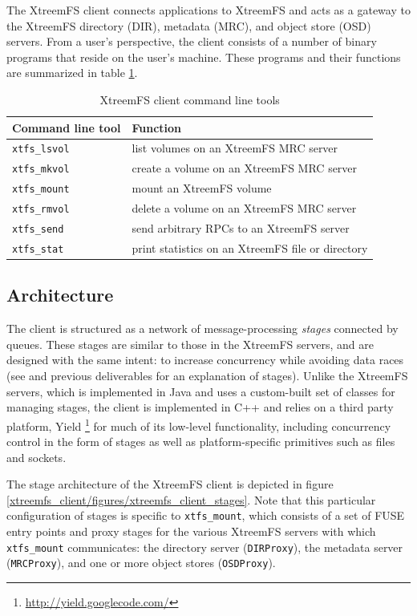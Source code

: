 The XtreemFS client connects applications to XtreemFS and acts as a gateway to the XtreemFS directory (DIR), metadata (MRC), and object store (OSD) servers. From a user's perspective, the client consists of a number of binary programs that reside on the user's machine. These programs and their functions are summarized in table \ref{xtreemfs_client/tables/command_line_tools}.

\begin{table}[!h]
\begin{tabularx}{\linewidth}{|l|X|}
\hline
Command line tool & Function \\
\hline
\texttt{xtfs\_lsvol} & list volumes on an XtreemFS MRC\index{MRC} server \\
\texttt{xtfs\_mkvol} & create a volume on an XtreemFS MRC\index{MRC} server \\
\texttt{xtfs\_mount} & mount an XtreemFS volume  \\
\texttt{xtfs\_rmvol} & delete a volume on an XtreemFS MRC\index{MRC} server \\
\texttt{xtfs\_send} & send arbitrary RPCs to an XtreemFS server \\
\texttt{xtfs\_stat} & print statistics on an XtreemFS file or directory \\
\hline
\end{tabularx}
\caption{XtreemFS client command line tools}
\label{xtreemfs_client/tables/command_line_tools}
\end{table}

\subsection{Architecture}

The client is structured as a network of message-processing \textit{stages} connected by queues. These stages are similar to those in the XtreemFS servers, and are designed with the same intent: to increase concurrency while avoiding data races (see \cite{SEDA} and previous deliverables for an explanation of stages). Unlike the XtreemFS servers, which is implemented in Java and uses a custom-built set of classes for managing stages, the client is implemented in C++ and relies on a third party platform, Yield \footnote{\url{http://yield.googlecode.com/}} for much of its low-level functionality, including concurrency control in the form of stages as well as platform-specific primitives such as files and sockets.

The stage architecture of the XtreemFS client is depicted in figure \ref{xtreemfs_client/figures/xtreemfs_client_stages}. Note that this particular configuration of stages is specific to \texttt{xtfs\_mount}, which consists of a set of FUSE entry points and proxy stages for the various XtreemFS servers with which \texttt{xtfs\_mount} communicates: the directory server (\texttt{DIRProxy}), the metadata server (\texttt{MRCProxy}), and one or more object stores (\texttt{OSDProxy}).

